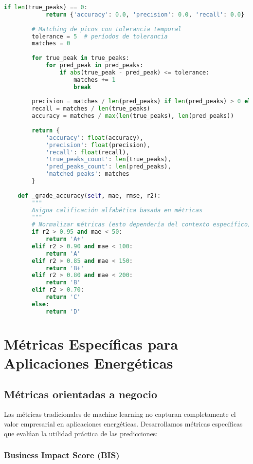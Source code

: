 \begin{lstlisting}[language=Python, caption=Framework integral de evaluación]
        if len(true_peaks) == 0:
            return {'accuracy': 0.0, 'precision': 0.0, 'recall': 0.0}
        
        # Matching de picos con tolerancia temporal
        tolerance = 5  # períodos de tolerancia
        matches = 0
        
        for true_peak in true_peaks:
            for pred_peak in pred_peaks:
                if abs(true_peak - pred_peak) <= tolerance:
                    matches += 1
                    break
        
        precision = matches / len(pred_peaks) if len(pred_peaks) > 0 else 0
        recall = matches / len(true_peaks)
        accuracy = matches / max(len(true_peaks), len(pred_peaks))
        
        return {
            'accuracy': float(accuracy),
            'precision': float(precision),
            'recall': float(recall),
            'true_peaks_count': len(true_peaks),
            'pred_peaks_count': len(pred_peaks),
            'matched_peaks': matches
        }
    
    def _grade_accuracy(self, mae, rmse, r2):
        """
        Asigna calificación alfabética basada en métricas
        """
        # Normalizar métricas (esto dependería del contexto específico)
        if r2 > 0.95 and mae < 50:
            return 'A+'
        elif r2 > 0.90 and mae < 100:
            return 'A'
        elif r2 > 0.85 and mae < 150:
            return 'B+'
        elif r2 > 0.80 and mae < 200:
            return 'B'
        elif r2 > 0.70:
            return 'C'
        else:
            return 'D'
\end{lstlisting}

\section{Métricas Específicas para Aplicaciones Energéticas}

\subsection{Métricas orientadas a negocio}

Las métricas tradicionales de machine learning no capturan completamente el valor empresarial en aplicaciones energéticas. Desarrollamos métricas específicas que evalúan la utilidad práctica de las predicciones:

\subsubsection{Business Impact Score (BIS)}

